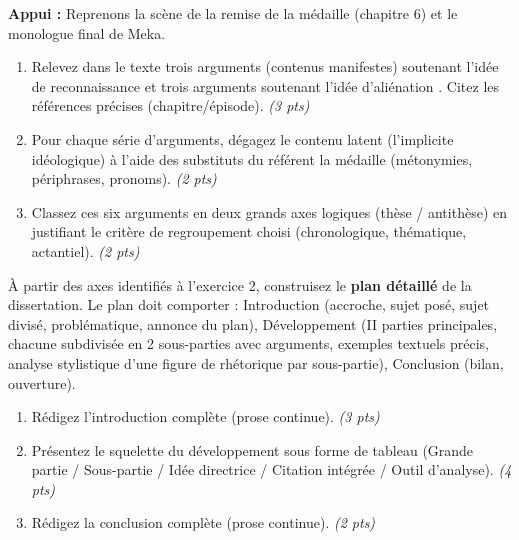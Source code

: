 \documentclass[11pt]{article}
\begin{document}
\begin{exercice}
\textbf{Appui :} Reprenons la scène de la remise de la médaille (chapitre 6) et le monologue final de Meka.
\begin{enumerate}
    \item Relevez dans le texte trois arguments (contenus manifestes) soutenant l'idée de \og reconnaissance \fg{} et trois arguments soutenant l'idée d'\og aliénation \fg{}. Citez les références précises (chapitre/épisode). \textit{(3 pts)}
    \item Pour chaque série d'arguments, dégagez le contenu latent (l'implicite idéologique) à l'aide des substituts du référent \og la médaille \fg{} (métonymies, périphrases, pronoms). \textit{(2 pts)}
    \item Classez ces six arguments en deux grands axes logiques (thèse / antithèse) en justifiant le critère de regroupement choisi (chronologique, thématique, actantiel). \textit{(2 pts)}
\end{enumerate}
\end{exercice}

\begin{exercice}
À partir des axes identifiés à l'exercice 2, construisez le \textbf{plan détaillé} de la dissertation. Le plan doit comporter : Introduction (accroche, sujet posé, sujet divisé, problématique, annonce du plan), Développement (II parties principales, chacune subdivisée en 2 sous-parties avec arguments, exemples textuels précis, analyse stylistique d'une figure de rhétorique par sous-partie), Conclusion (bilan, ouverture).
\begin{enumerate}
    \item Rédigez l'introduction complète (prose continue). \textit{(3 pts)}
    \item Présentez le squelette du développement sous forme de tableau (Grande partie / Sous-partie / Idée directrice / Citation intégrée / Outil d'analyse). \textit{(4 pts)}
    \item Rédigez la conclusion complète (prose continue). \textit{(2 pts)}
\end{enumerate}
\end{exercice}
\end{document}
